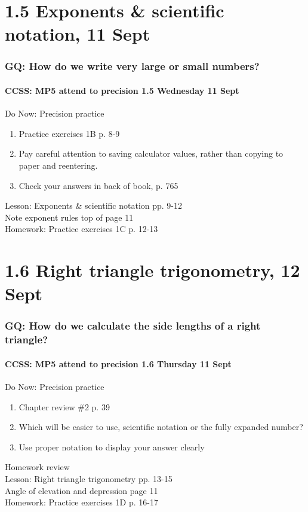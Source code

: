 \documentclass{beamer}
\begin{document}
  \section{1.5 Exponents \& scientific notation, 11 Sept}
  \frame
  {
    \frametitle{GQ: How do we write very large or small numbers?}
    \framesubtitle{CCSS: MP5 attend to precision \hfill \alert{1.5 Wednesday 11 Sept}}

    \begin{block}{Do Now: Precision practice}
    \begin{enumerate}
        \item Practice exercises 1B p. 8-9
        \item Pay careful attention to saving calculator values, rather than copying to paper and reentering.
        \item Check your answers in back of book, p. 765
    \end{enumerate}
    \end{block}
    Lesson: Exponents \& scientific notation pp. 9-12\\ \smallskip
    Note exponent rules top of page 11\\ \smallskip
    Homework: Practice exercises 1C p. 12-13
  }


  \section{1.6 Right triangle trigonometry, 12 Sept}
  \frame
  {
    \frametitle{GQ: How do we calculate the side lengths of a right triangle?}
    \framesubtitle{CCSS: MP5 attend to precision \hfill \alert{1.6 Thursday 11 Sept}}

    \begin{block}{Do Now: Precision practice}
    \begin{enumerate}
        \item Chapter review \#2 p. 39
        \item Which will be easier to use, scientific notation or the fully expanded number?
        \item Use proper notation to display your answer clearly
    \end{enumerate}
    \end{block}
    Homework review \\
    Lesson: Right triangle trigonometry pp. 13-15\\ \smallskip
    Angle of elevation and depression page 11\\ \smallskip
    Homework: Practice exercises 1D p. 16-17
  }
\end{document}
